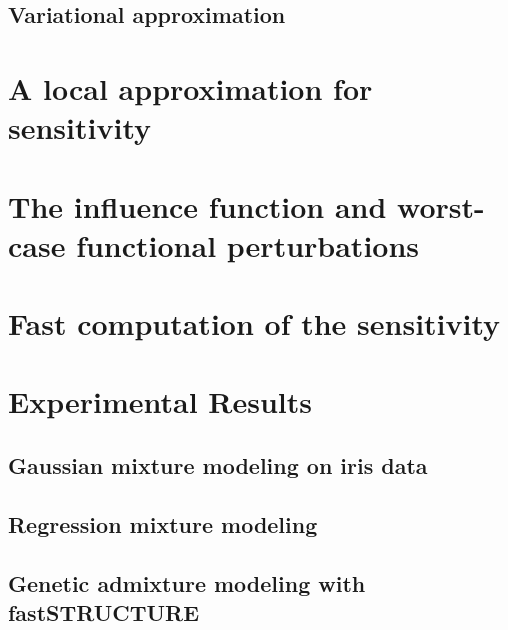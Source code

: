 \documentclass[ba]{imsart}
\begin{document}
    \subsection{Variational approximation}
    


\section{A local approximation for sensitivity}


\section{The influence function and worst-case functional perturbations}


\section{Fast computation of the sensitivity}


\section{Experimental Results}


    \subsection{Gaussian mixture modeling on iris data}
    

    \subsection{Regression mixture modeling}
    

    \subsection{Genetic admixture modeling with fastSTRUCTURE}
    
\end{document}
